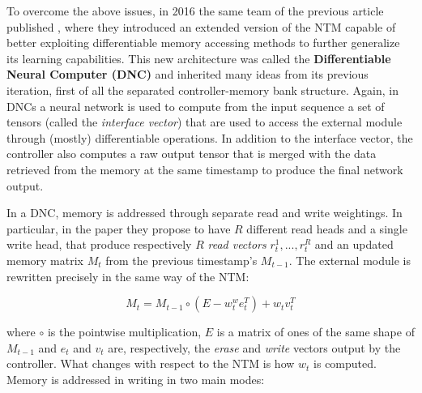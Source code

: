 \documentclass{article}
\begin{document}
To overcome the above issues, in 2016 the same team of the previous article published \cite{GRA16}, where they introduced an extended version of the NTM capable of better exploiting differentiable memory accessing methods to further generalize its learning capabilities. This new architecture was called the \textbf{Differentiable Neural Computer (DNC)} and inherited many ideas from its previous iteration, first of all the separated controller-memory bank structure. Again, in DNCs a neural network is used to compute from the input sequence a set of tensors (called the \textit{interface vector}) that are used to access the external module through (mostly) differentiable operations. In addition to the interface vector, the controller also computes a raw output tensor that is merged with the data retrieved from the memory at the same timestamp to produce the final network output.

In a DNC, memory is addressed through separate read and write weightings. In particular, in the paper they propose to have $R$ different read heads and a single write head, that produce respectively $R$ \textit{read vectors} $r_t^1,..., r_t^R$ and an updated memory matrix $M_t$ from the previous timestamp's $M_{t-1}$. The external module is rewritten precisely in the same way of the NTM:

\begin{equation}
    M_t = M_{t-1} \circ (E-w_t^w e_t^T) + w_t v_t^T
\end{equation}

where $\circ$ is the pointwise multiplication, $E$ is a matrix of ones of the same shape of $M_{t-1}$ and $e_t$ and $v_t$ are, respectively, the \textit{erase} and \textit{write} vectors output by the controller. What changes with respect to the NTM is how $w_t$ is computed. Memory is addressed in writing in two main modes:
\end{document}
